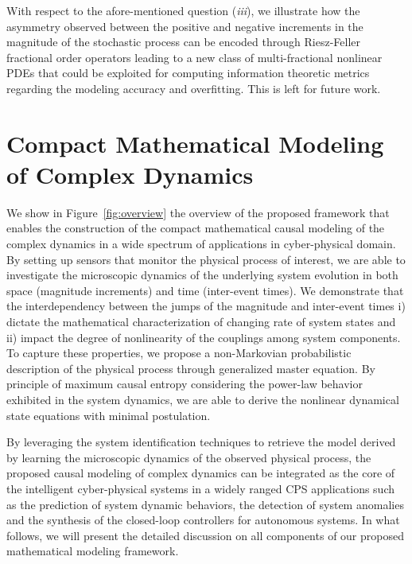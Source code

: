   With respect to the afore-mentioned question (\textit{iii}), we illustrate how the asymmetry observed between the positive and negative increments in the magnitude of the stochastic process can be encoded through Riesz-Feller fractional order operators leading to a new class of multi-fractional nonlinear PDEs that could be exploited for computing information theoretic metrics regarding the modeling accuracy and overfitting. This is left for future work. 
\section{Compact Mathematical Modeling of Complex Dynamics}
\label{s:MathematicalModeling}
We show in Figure~\ref{fig:overview} the overview of the proposed framework that enables the construction of the compact mathematical causal modeling of the complex dynamics in a wide spectrum of applications in cyber-physical domain. By setting up sensors that monitor the physical process of interest, we are able to investigate the microscopic dynamics of the underlying system evolution in both space (magnitude increments) and time (inter-event times). We demonstrate that the interdependency between the jumps of the magnitude and inter-event times i) dictate the mathematical characterization of changing rate of system states and ii) impact the degree of nonlinearity of the couplings among system components. To capture these properties, we propose a non-Markovian probabilistic description of the physical process through generalized master equation. By principle of maximum causal entropy considering the power-law behavior exhibited in the system dynamics, we are able to derive the nonlinear dynamical state equations with minimal postulation. 

By leveraging the system identification techniques to retrieve the model derived by learning the microscopic dynamics of the observed physical process, the proposed causal modeling of complex dynamics can be integrated as the core of the intelligent cyber-physical systems in a widely ranged CPS applications such as the prediction of system dynamic behaviors, the detection of system anomalies and the synthesis of the closed-loop controllers for autonomous systems. In what follows, we will present the detailed discussion on all components of our proposed mathematical modeling framework.

